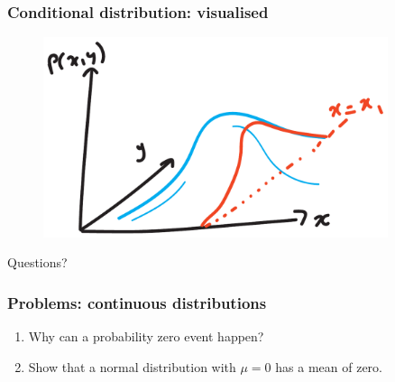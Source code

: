 \documentclass{beamer}
\begin{document}
	\begin{frame}
		\frametitle{Conditional distribution: visualised}
		
		\begin{figure}[ht]
			\centerline{\includegraphics[width=0.9\textwidth]{./figures/multivariate_continuous_conditional.pdf}}
		\end{figure}
			
	\end{frame}
	
	\begin{frame}
		\Large Questions?
	\end{frame}
	
	\begin{frame}
		
		\frametitle{Problems: continuous distributions}
		
		\begin{enumerate}
			\item Why can a probability zero event happen?
			\item Show that a normal distribution with $\mu=0$ has a mean of zero.
		\end{enumerate}

	\end{frame}
	
\end{document}
